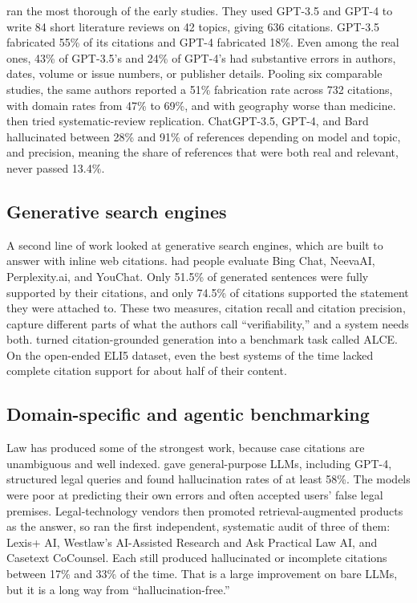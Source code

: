 \documentclass[acmsmall,screen]{acmart}
\begin{document}
\citet{walters2023} ran the most thorough of the early studies. They used GPT-3.5 and GPT-4 to write 84 short literature reviews on 42 topics, giving 636 citations. GPT-3.5 fabricated 55\% of its citations and GPT-4 fabricated 18\%. Even among the real ones, 43\% of GPT-3.5's and 24\% of GPT-4's had substantive errors in authors, dates, volume or issue numbers, or publisher details. Pooling six comparable studies, the same authors reported a 51\% fabrication rate across 732 citations, with domain rates from 47\% to 69\%, and with geography worse than medicine. \citet{chelli2024} then tried systematic-review replication. ChatGPT-3.5, GPT-4, and Bard hallucinated between 28\% and 91\% of references depending on model and topic, and precision, meaning the share of references that were both real and relevant, never passed 13.4\%.

\subsection{Generative search engines}
A second line of work looked at generative search engines, which are built to answer with inline web citations. \citet{liu2023} had people evaluate Bing Chat, NeevaAI, Perplexity.ai, and YouChat. Only 51.5\% of generated sentences were fully supported by their citations, and only 74.5\% of citations supported the statement they were attached to. These two measures, citation recall and citation precision, capture different parts of what the authors call ``verifiability,'' and a system needs both. \citet{gao2023} turned citation-grounded generation into a benchmark task called ALCE. On the open-ended ELI5 dataset, even the best systems of the time lacked complete citation support for about half of their content.

\subsection{Domain-specific and agentic benchmarking}
Law has produced some of the strongest work, because case citations are unambiguous and well indexed. \citet{dahl2024} gave general-purpose LLMs, including GPT-4, structured legal queries and found hallucination rates of at least 58\%. The models were poor at predicting their own errors and often accepted users' false legal premises. Legal-technology vendors then promoted retrieval-augmented products as the answer, so \citet{magesh2025} ran the first independent, systematic audit of three of them: Lexis+ AI, Westlaw's AI-Assisted Research and Ask Practical Law AI, and Casetext CoCounsel. Each still produced hallucinated or incomplete citations between 17\% and 33\% of the time. That is a large improvement on bare LLMs, but it is a long way from ``hallucination-free.''
\end{document}

